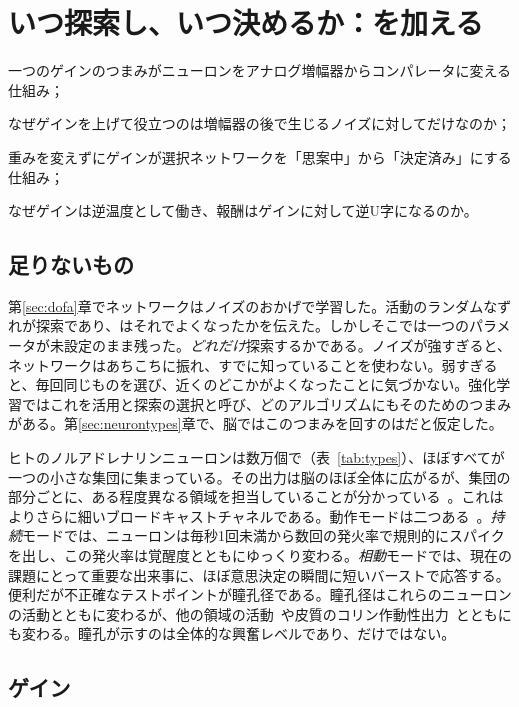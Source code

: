 \chapter{いつ探索し、いつ決めるか：を加える}
\label{sec:nora}
\begin{chaptergoals}
\item 一つのゲインのつまみがニューロンをアナログ増幅器からコンパレータに変える仕組み；
\item なぜゲインを上げて役立つのは増幅器の後で生じるノイズに対してだけなのか；
\item 重みを変えずにゲインが選択ネットワークを「思案中」から「決定済み」にする仕組み；
\item なぜゲインは逆温度として働き、報酬はゲインに対して逆U字になるのか。
\end{chaptergoals}

\section{足りないもの}

第\ref{sec:dofa}章でネットワークはノイズのおかげで学習した。活動のランダムなずれが探索であり、はそれでよくなったかを伝えた。しかしそこでは一つのパラメータが未設定のまま残った。\emph{どれだけ}探索するかである。ノイズが強すぎると、ネットワークはあちこちに振れ、すでに知っていることを使わない。弱すぎると、毎回同じものを選び、近くのどこかがよくなったことに気づかない。強化学習ではこれを活用と探索の選択と呼び、どのアルゴリズムにもそのためのつまみがある。第\ref{sec:neurontypes}章で、脳ではこのつまみを回すのはだと仮定した。

ヒトのノルアドレナリンニューロンは数万個で（表~\ref{tab:types}）、ほぼすべてが一つの小さな集団に集まっている。その出力は脳のほぼ全体に広がるが、集団の部分ごとに、ある程度異なる領域を担当していることが分かっている~\cite{Poe2020}。これはよりさらに細いブロードキャストチャネルである。動作モードは二つある~\cite{AstonJones2005}。\emph{持続}モードでは、ニューロンは毎秒1回未満から数回の発火率で規則的にスパイクを出し、この発火率は覚醒度とともにゆっくり変わる。\emph{相動}モードでは、現在の課題にとって重要な出来事に、ほぼ意思決定の瞬間に短いバーストで応答する。便利だが不正確なテストポイントが瞳孔径である。瞳孔径はこれらのニューロンの活動とともに変わるが、他の領域の活動~\cite{Joshi2016}や皮質のコリン作動性出力~\cite{Reimer2016}とともにも変わる。瞳孔が示すのは全体的な興奮レベルであり、だけではない。

\section{ゲイン}

